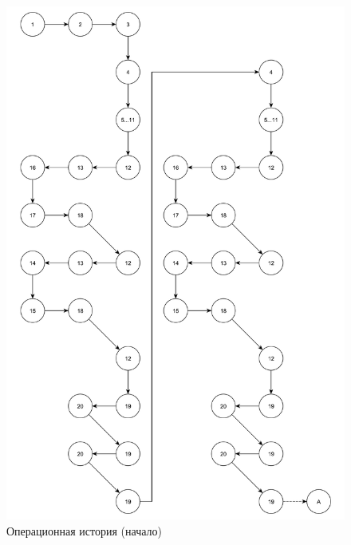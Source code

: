 \begin{figure}[h]
	\centering
	\includegraphics[height=0.7\textheight]{img/операционная_история_1.pdf}
	\caption{Операционная история (начало)}
	\label{fg:oi_1}
\end{figure}

\clearpage

